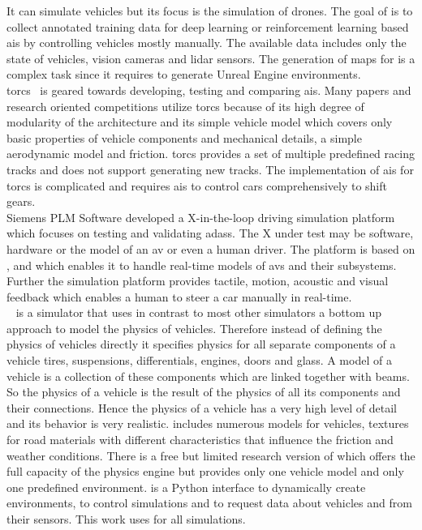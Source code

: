 It can simulate vehicles but its focus is the simulation of drones.
The goal of \airsim{} is to collect annotated training data for deep learning or reinforcement learning based \glspl{ai} by controlling vehicles mostly manually.
The available data includes only the state of vehicles, vision cameras and \gls{lidar} sensors.
The generation of maps for \airsim{} is a complex task since it requires to generate Unreal Engine environments.\\
\Gls{torcs}~\cite{torcs} is geared towards developing, testing and comparing \glspl{ai}.
Many papers and research oriented competitions utilize \gls{torcs} because of its high degree of modularity of the architecture and its simple vehicle model which covers only basic properties of vehicle components and mechanical details, a simple aerodynamic model and friction.
\Gls{torcs} provides a set of multiple predefined racing tracks and does not support generating new tracks.
The implementation of \glspl{ai} for \gls{torcs} is complicated and requires \glspl{ai} to control cars comprehensively \eg{} to shift gears.\\
Siemens PLM Software developed a X-in-the-loop driving simulation platform~\cite{xInTheLoop} which focuses on testing and validating \glspl{adas}.
The X under test may be software, hardware or the model of an \gls{av} or even a human driver.
The platform is based on \prescan{}, \matlab{} and \simulink{} which enables it to handle real-time models of \glspl{av} and their subsystems.
Further the simulation platform provides tactile, motion, acoustic and visual feedback which enables a human to steer a car manually in real-time.\\
\beamng{}~\cite{beamNG} is a simulator that uses in contrast to most other simulators a bottom up approach to model the physics of vehicles.
Therefore instead of defining the physics of vehicles directly it specifies physics for all separate components of a vehicle \eg{} tires, suspensions, differentials, engines, doors and glass.
A model of a vehicle is a collection of these components which are linked together with beams.
So the physics of a vehicle is the result of the physics of all its components and their connections.
Hence the physics of a vehicle has a very high level of detail and its behavior is very realistic.
\beamng{} includes numerous models for vehicles, textures for road materials with different characteristics that influence the friction and weather conditions.
There is a free but limited research version of \beamng{} which offers the full capacity of the physics engine but provides only one vehicle model and only one predefined environment.
\beamngpy{} is a Python interface to dynamically create environments, to control \beamng{} simulations and to request data about vehicles and from their sensors.
This work uses \beamng{} for all simulations.

